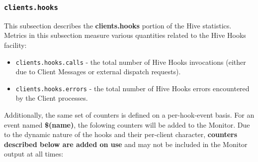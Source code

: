 \documentclass[a4paper]{article}
\begin{document}
\subsubsection{\texttt{clients.hooks}}
\label{sec-4-2-10}

This subsection describes the \textbf{clients.hooks} portion of the Hive statistics. Metrics in this subsection measure various quantities related to the Hive Hooks facility:


\begin{itemize}
\item \texttt{clients.hooks.calls} - the total number of Hive Hooks invocations (either due to Client Messages or external dispatch requests).
\item \texttt{clients.hooks.errors} - the total number of Hive Hooks errors encountered by the Client processes.
\end{itemize}

\noindent
Additionally, the same set of counters is defined on a per-hook-event basis. For an event named \textbf{\$(name)}, the folowing counters will be added to the Monitor. Due to the dynamic nature of the hooks and their per-client character, \textbf{counters described below are added on use} and may not be included in the Monitor output at all times:
\end{document}
